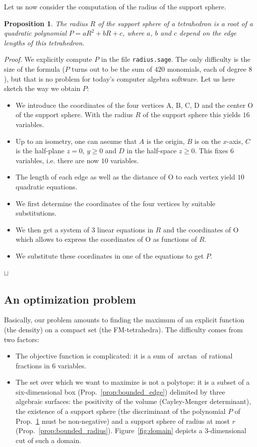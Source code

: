 \documentclass[11pt]{article}
\newtheorem{proposition}{Proposition}
\newenvironment{proof}{\noindent \emph{Proof. }}{\hfill \hbox{\rlap{$\sqcap$}$\sqcup$}\\}
\begin{document}
Let us now consider the computation of the radius of the support sphere.

\begin{proposition}
\label{prop:radius}
The radius $R$ of the support sphere of a tetrahedron is a root of a quadratic polynomial $P=aR^2+bR+c$, where $a$, $b$ and $c$ depend on the edge lengths of this tetrahedron.
\end{proposition}

\begin{proof}
We explicitly compute $P$ in the file \verb+radius.sage+.
The only difficulty is the size of the formula ($P$ turns out to be the sum of $420$ monomials, each of degree $8$), but that is no problem for today's computer algebra software.
Let us here sketch the way we obtain $P$:
\begin{itemize}
\item
We introduce the coordinates of the four vertices A, B, C, D and the center O of the support sphere.
With the radius $R$ of the support sphere this yields $16$ variables.
\item
Up to an isometry, one can assume that $A$ is the origin, $B$ is on the $x$-axis, $C$ is the half-plane $z=0$, $y\geq 0$ and $D$ in the half-space $z\geq 0$.
This fixes $6$ variables, i.e. there are now $10$ variables.
\item
The length of each edge as well as the distance of O to each vertex yield $10$ quadratic equations.
\item
We first determine the coordinates of the four vertices by suitable substitutions.
\item
We then get a system of $3$ linear equations in $R$ and the coordinates of O which allows to express the coordinates of O as functions of $R$.
\item
We substitute these coordinates in one of the equations to get $P$.
\end{itemize}
\end{proof}



\subsection{An optimization problem}


Basically, our problem amounts to finding the maximum of an explicit function (the density) on a compact set (the FM-tetrahedra).
The difficulty comes from two factors:
\begin{itemize}
\item The objective function is complicated: it is a sum of $\arctan$ of rational fractions in $6$ variables.
\item The set over which we want to maximize is not a polytope: it is a subset of a six-dimensional box (Prop.~\ref{prop:bounded_edge}) delimited by three algebraic surfaces: the positivity of the volume (Cayley-Menger determinant), the existence of a support sphere (the discriminant of the polynomial $P$ of Prop.~\ref{prop:radius} must be non-negative) and a support sphere of radius at most $r$ (Prop.~\ref{prop:bounded_radius}).
Figure~\ref{fig:domain} depicts a 3-dimensional cut of such a domain.
\end{itemize}
\end{document}
